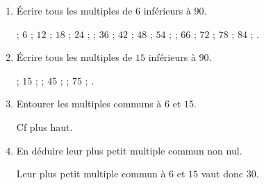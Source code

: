     \begin{enumerate}
        \item Écrire tous les multiples de $6$ inférieurs à $90$.

         ; $6$ ; $12$ ; $18$ ; $24$ ;  ; $36$ ; $42$ ; $48$ ; $54$ ;  ; $66$ ; $72$ ; $78$ ; $84$ ; .
        \item Écrire tous les multiples de $15$ inférieurs à $90$.

         ; $15$ ;  ; $45$ ;  ; $75$ ; .
        \item Entourer les multiples communs à $6$ et $15$.

        Cf plus haut.
        \item En déduire leur plus petit multiple commun non nul.

        Leur plus petit multiple commun à $6$ et $15$ vaut donc $30$.
    \end{enumerate}
